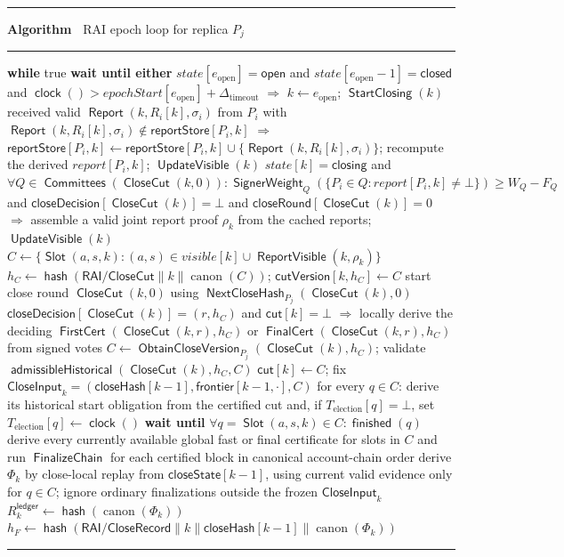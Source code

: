 \documentclass[sigplan,twocolumn,review,anonymous]{acmart}
\newenvironment{breakablealgorithm}
{%
  \par\addvspace{\baselineskip}%
  \begingroup\footnotesize
  \setlength{\baselineskip}{10pt}%
  \refstepcounter{algorithm}%
  \noindent\hrule\kern2pt%
  \renewcommand{\caption}[1]{%
    \noindent\textbf{Algorithm~\thealgorithm} ##1\par\kern2pt\hrule\kern2pt%
  }%
}
{%
  \kern2pt\hrule\par\endgroup\addvspace{\baselineskip}%
}
\newcommand{\func}[1]{\operatorname{\mathsf{#1}}}
\newcommand{\hash}{\func{hash}}
\newcommand{\FirstCert}{\func{FirstCert}}
\newcommand{\FinalCert}{\func{FinalCert}}
\newcommand{\Report}{\func{Report}}
\newcommand{\Slot}{\func{Slot}}
\newcommand{\CloseCut}{\func{CloseCut}}
\newcommand{\closeDecision}{\mathsf{closeDecision}}
\newcommand{\closeRound}{\mathsf{closeRound}}
\newcommand{\finished}{\func{finished}}
\newcommand{\admissibleHistorical}{\func{admissibleHistorical}}
\newcommand{\UpdateVisible}{\func{UpdateVisible}}
\newcommand{\StartClosing}{\func{StartClosing}}
\newcommand{\frontier}{\mathsf{frontier}}
\newcommand{\closeHash}{\mathsf{closeHash}}
\newcommand{\FinalizeChain}{\func{FinalizeChain}}
\newcommand{\Committees}{\func{Committees}}
\newcommand{\reportStore}{\mathsf{reportStore}}
\newcommand{\closeCut}{\mathsf{cut}}
\newcommand{\closeState}{\mathsf{closeState}}
\newcommand{\ReportVisible}{\func{ReportVisible}}
\newcommand{\cutVersion}{\mathsf{cutVersion}}
\newcommand{\SignerWeight}{\func{SignerWeight}}
\begin{document}
\begin{breakablealgorithm}
\caption{RAI epoch loop for replica $P_j$}
\begin{algorithmic}[1]
\State \textbf{while} true \textbf{wait until either}
\Statex
\State $state[e_{\mathrm{open}}]=\mathsf{open}$ and $state[e_{\mathrm{open}}-1]=\mathsf{closed}$ and $\func{clock}()>epochStart[e_{\mathrm{open}}]+\Delta_{\mathrm{timeout}}$ $\Rightarrow$
\State \quad $k\gets e_{\mathrm{open}}$; $\StartClosing(k)$
\Statex
\State received valid $\Report(k,R_i[k],\sigma_i)$ from $P_i$ with $\Report(k,R_i[k],\sigma_i)\notin\reportStore[P_i,k]$ $\Rightarrow$
\State \quad $\reportStore[P_i,k]\gets\reportStore[P_i,k]\cup\{\Report(k,R_i[k],\sigma_i)\}$; recompute the derived $report[P_i,k]$; $\UpdateVisible(k)$
\Statex
\State $state[k]=\mathsf{closing}$ and $\forall Q\in\Committees(\CloseCut(k,0)):
\SignerWeight_Q(\{P_i\in Q:report[P_i,k]\neq\bot\})\ge W_Q-F_Q$ and $\closeDecision[\CloseCut(k)]=\bot$ and $\closeRound[\CloseCut(k)]=0$ $\Rightarrow$
\State \quad assemble a valid joint report proof $\rho_k$ from the cached reports; $\UpdateVisible(k)$
\State \quad $C\gets\{\Slot(a,s,k):(a,s)\in visible[k]\cup\ReportVisible(k,\rho_k)\}$
\State \quad $h_C\gets\hash(\mathsf{RAI/CloseCut}\parallel k\parallel\operatorname{canon}(C))$; $\cutVersion[k,h_C]\gets C$
\State \quad start close round $\CloseCut(k,0)$ using $\func{NextCloseHash}_{P_j}(\CloseCut(k),0)$
\Statex
\State $\closeDecision[\CloseCut(k)]=(r,h_C)$ and $\closeCut[k]=\bot$ $\Rightarrow$
\State \quad locally derive the deciding $\FirstCert(\CloseCut(k,r),h_C)$ or $\FinalCert(\CloseCut(k,r),h_C)$ from signed votes
\State \quad $C\gets\func{ObtainCloseVersion}_{P_j}(\CloseCut(k),h_C)$; validate $\admissibleHistorical(\CloseCut(k),h_C,C)$
\State \quad $\closeCut[k]\gets C$; fix $\mathsf{CloseInput}_k=(\closeHash[k-1],\frontier[k-1,\cdot],C)$
\State \quad for every $q\in C$: derive its historical start obligation from the certified cut and, if $T_{\mathrm{election}}[q]=\bot$, set $T_{\mathrm{election}}[q]\gets\func{clock}()$
\State \quad \textbf{wait until} $\forall q=\Slot(a,s,k)\in C:\finished(q)$
\State \quad derive every currently available global fast or final certificate for slots in $C$ and run $\FinalizeChain$ for each certified block in canonical account-chain order
\State \quad derive $\Phi_k$ by close-local replay from $\closeState[k-1]$, using current valid evidence only for $q\in C$; ignore ordinary finalizations outside the frozen $\mathsf{CloseInput}_k$
\State \quad $R^{\mathsf{ledger}}_k\gets\hash(\operatorname{canon}(\Phi_k))$
\State \quad $h_F\gets\hash(\mathsf{RAI/CloseRecord}\parallel k\parallel\closeHash[k-1]\parallel\operatorname{canon}(\Phi_k))$

\end{algorithmic}
\end{breakablealgorithm}
\end{document}
